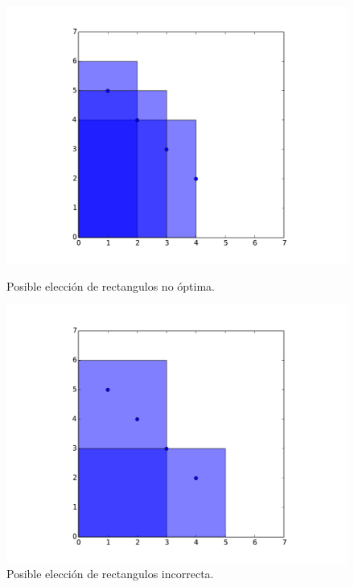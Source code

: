 \begin{figure}[H]
\centering
\begin{minipage}{0.49\textwidth}
  \centering
    \includegraphics[width=1\textwidth]{img/ejemplos/ej2-1.pdf}
  \caption{\footnotesize Posible elección de rectangulos no óptima.}
  \label{fig:ej3-1}
\end{minipage}%
\hspace{0.01\textwidth}
\begin{minipage}{0.49\textwidth}   
  \centering
    \includegraphics[width=1\textwidth]{img/ejemplos/ej2-2.pdf} 
  \caption{\footnotesize Posible elección de rectangulos incorrecta.}
  \label{fig:ej3-2}
\end{minipage}%
\end{figure}


